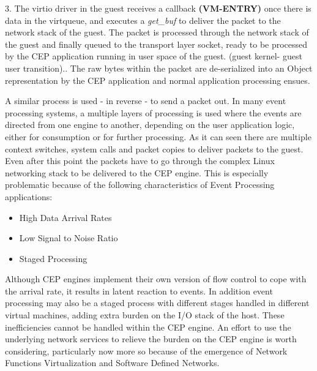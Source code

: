 3. The virtio driver in the guest receives a callback \textbf{(VM-ENTRY)} once there is data in the virtqueue, and executes a \textit{get_buf}  to deliver the packet to the network stack of the guest. The packet is processed through the network stack of the guest and finally queued to the transport layer socket, ready to be processed by the CEP application running in user space of the guest.  (guest kernel- guest user transition).\newline {}. The raw bytes within the packet are de-serialized into an Object representation by the CEP application and normal application processing ensues.\newline  
 

A similar process is used - in reverse - to send a packet out. In many event processing systems, a multiple layers of processing is used where the events are directed from one engine to another, depending on the user application logic, either for consumption or for further processing. As it can seen there are multiple context switches, system calls and packet copies to deliver packets to the guest. Even after this point the packets have to go through the complex Linux networking stack \cite{beifuss2015study} to be delivered to the CEP engine.  This is especially problematic because of the following characteristics of Event Processing applications:
\begin{itemize}
	\item High Data Arrival Rates
	\item Low Signal to Noise Ratio
	\item Staged Processing
\end{itemize}

 Although CEP engines implement their own version of flow control to cope with the arrival rate, it results in latent reaction to events. In addition event processing may also be a staged process with different stages handled in different virtual machines, adding extra burden on the I/O stack of the host. These inefficiencies cannot be handled within the CEP engine. An effort to use the underlying network services to relieve the burden on the CEP engine is worth considering, particularly now more so because of the emergence of Network Functions Virtualization and Software Defined Networks. 


